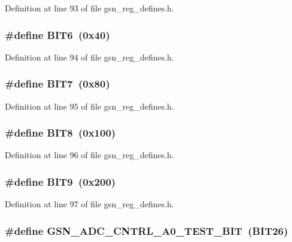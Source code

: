 Definition at line 93 of file gsn\_\-reg\_\-defines.h.

\hypertarget{a00546_acc2d074401e2b6322ee8f03476c24677}{
\subsubsection[{BIT6}]{\setlength{\rightskip}{0pt plus 5cm}\#define BIT6~(0x40)}}
\label{a00546_acc2d074401e2b6322ee8f03476c24677}


Definition at line 94 of file gsn\_\-reg\_\-defines.h.

\hypertarget{a00546_aa6b8f3261ae9e2e1043380c192f7b5f0}{
\subsubsection[{BIT7}]{\setlength{\rightskip}{0pt plus 5cm}\#define BIT7~(0x80)}}
\label{a00546_aa6b8f3261ae9e2e1043380c192f7b5f0}


Definition at line 95 of file gsn\_\-reg\_\-defines.h.

\hypertarget{a00546_a0e80e65237843fa1ff15c68cd78066f8}{
\subsubsection[{BIT8}]{\setlength{\rightskip}{0pt plus 5cm}\#define BIT8~(0x100)}}
\label{a00546_a0e80e65237843fa1ff15c68cd78066f8}


Definition at line 96 of file gsn\_\-reg\_\-defines.h.

\hypertarget{a00546_a3aa20ab5eb33383fa31b0e94f4401cdf}{
\subsubsection[{BIT9}]{\setlength{\rightskip}{0pt plus 5cm}\#define BIT9~(0x200)}}
\label{a00546_a3aa20ab5eb33383fa31b0e94f4401cdf}


Definition at line 97 of file gsn\_\-reg\_\-defines.h.

\hypertarget{a00546_aacb13c1037271227e06e54a62b2b1fa7}{
\subsubsection[{GSN\_\-ADC\_\-CNTRL\_\-A0\_\-TEST\_\-BIT}]{\setlength{\rightskip}{0pt plus 5cm}\#define GSN\_\-ADC\_\-CNTRL\_\-A0\_\-TEST\_\-BIT~(BIT26)}}
\label{a00546_aacb13c1037271227e06e54a62b2b1fa7}


